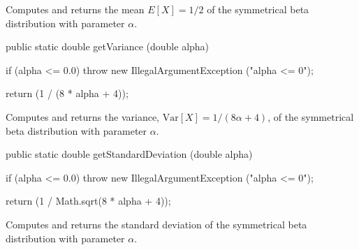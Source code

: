 \begin{tabb}  Computes and returns the mean $E[X] = 1/2$ of the symmetrical beta
   distribution with parameter $\alpha$.
\end{tabb}
\begin{htmlonly}
\end{htmlonly}
\begin{code}

   public static double getVariance (double alpha)\begin{hide} {
      if (alpha <= 0.0)
         throw new IllegalArgumentException ("alpha <= 0");

      return (1 / (8 * alpha + 4));
   }\end{hide}
\end{code}
\begin{tabb}  Computes and returns the variance, $\mbox{Var}[X] = 1/(8\alpha + 4)$,
   of the symmetrical beta distribution with parameter $\alpha$.
\end{tabb}
\begin{htmlonly}
\end{htmlonly}
\begin{code}

   public static double getStandardDeviation (double alpha)\begin{hide} {
      if (alpha <= 0.0)
         throw new IllegalArgumentException ("alpha <= 0");

      return (1 / Math.sqrt(8 * alpha + 4));
   }\end{hide}
\end{code}
\begin{tabb}  Computes and returns the standard deviation of the
   symmetrical beta distribution with parameter $\alpha$.
\end{tabb}
\begin{htmlonly}
\end{htmlonly}
